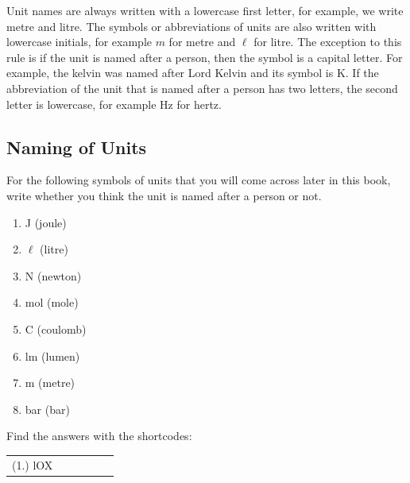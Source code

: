       \label{m30853*id62947}Unit names are always written with a lowercase first letter, for
example, we write metre and litre. The symbols or
abbreviations of units are also written with lowercase initials,
for example \begin{math}m\end{math} for metre and \begin{math}\ell \end{math} for litre. The exception to
this rule is if the unit is named after a person, then the
symbol is a capital letter. For example, the kelvin was named
after Lord Kelvin and its symbol is K. If the abbreviation of the unit that is named after a person has two letters, the second letter is lowercase, for example Hz for hertz.\par 
\label{m30853*secfhsst!!!underscore!!!id205}
            \subsection{  Naming of Units }
            \nopagebreak
            
      \label{m30853*id62978}For the following symbols of units that you will come across later
in this book, write whether you think the unit is named after a
person or not.\par 
      \label{m30853*id62985}\begin{enumerate}[noitemsep, label=\textbf{\arabic*}. ] 
            \label{m30853*uid7}\item J (joule)
\label{m30853*uid8}\item \begin{math}\ell \end{math} (litre)
\label{m30853*uid9}\item N (newton)
\label{m30853*uid10}\item mol (mole)
\label{m30853*uid11}\item C (coulomb)
\label{m30853*uid12}\item lm (lumen)
\label{m30853*uid13}\item m (metre)
\label{m30853*uid14}\item bar (bar)
\end{enumerate}
        \label{m30853*eip-463}        \par 
      

    
\par {} Find the answers with the shortcodes:
 \par \begin{tabular}[h]{cccccc}
 (1.) lOX  & \end{tabular}



